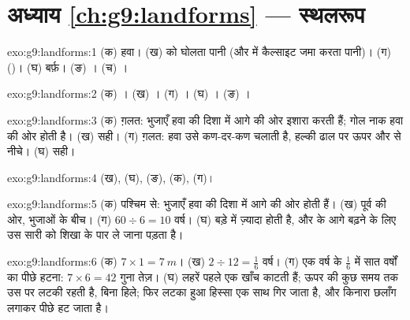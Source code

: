 \section*{अध्याय \ref{ch:g9:landforms} --- स्थलरूप}

\begin{solution}{exo:g9:landforms:1}
(क) हवा। (ख)  को घोलता पानी (और  में कैल्साइट जमा करता पानी)। (ग) 
()। (घ) बर्फ़। (ङ) । (च) ।
\end{solution}

\begin{solution}{exo:g9:landforms:2}
(क) । (ख) । (ग) । (घ) ।
(ङ) ।
\end{solution}

\begin{solution}{exo:g9:landforms:3}
(क) ग़लत: भुजाएँ हवा की दिशा में आगे की ओर इशारा करती हैं; गोल नाक हवा की ओर होती है।
(ख) सही। (ग) ग़लत: हवा उसे कण-दर-कण चलाती है, हल्की ढाल पर ऊपर और  से
नीचे। (घ) सही।
\end{solution}

\begin{solution}{exo:g9:landforms:4}
(ख), (घ), (ङ), (क), (ग)।
\end{solution}

\begin{solution}{exo:g9:landforms:5}
(क) पश्चिम से: भुजाएँ हवा की दिशा में आगे की ओर होती हैं। (ख) पूर्व की ओर, भुजाओं के बीच।
(ग) $60 \div 6 = 10$ वर्ष। (घ) बड़े  में ज़्यादा  होती है, और  के आगे
बढ़ने के लिए उस सारी  को शिखा के पार ले जाना पड़ता
है।
\end{solution}

\begin{solution}{exo:g9:landforms:6}
(क) $7 \times 1 = \qty{7}{m}$। (ख) $2 \div 12 = \frac{1}{6}$ वर्ष।
(ग) एक वर्ष के $\frac{1}{6}$ में सात वर्षों का पीछे हटना: $7 \times 6 = 42$
गुना तेज़। (घ) लहरें पहले एक खाँच काटती हैं; ऊपर की  कुछ समय तक उस पर लटकी रहती है,
बिना हिले; फिर लटका हुआ हिस्सा एक साथ गिर जाता है, और किनारा छलाँग लगाकर पीछे हट जाता
है।
\end{solution}

